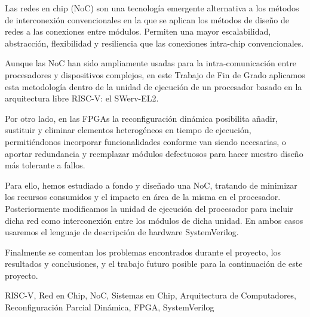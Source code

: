 
Las redes en chip (NoC) son una tecnología emergente alternativa a los métodos de interconexión convencionales en la que se aplican los métodos de diseño de redes a las conexiones entre módulos. Permiten una mayor escalabilidad, abstracción, flexibilidad y resiliencia que las conexiones intra-chip convencionales.

Aunque las NoC han sido ampliamente usadas para la intra-comunicación entre procesadores y dispositivos complejos, en este Trabajo de Fin de Grado aplicamos esta metodología dentro de la unidad de ejecución de un procesador basado en la arquitectura libre RISC-V: el SWerv-EL2.

Por otro lado, en las FPGAs la reconfiguración dinámica posibilita añadir, sustituir y eliminar elementos heterogéneos en tiempo de ejecución, permitiéndonos incorporar funcionalidades conforme van siendo necesarias, o aportar redundancia y reemplazar módulos defectuosos para hacer nuestro diseño más tolerante a fallos.

Para ello, hemos estudiado a fondo y diseñado una NoC, tratando de minimizar los recursos consumidos y el impacto en área de la misma en el procesador. Posteriormente modificamos la unidad de ejecución del procesador para incluir dicha red como interconexión entre los módulos de dicha unidad. En ambos casos usaremos el lenguaje de descripción de hardware SystemVerilog.

Finalmente se comentan los problemas encontrados durante el proyecto, los resultados y conclusiones, y el trabajo futuro posible para la continuación de este proyecto.

\vfill
\begin{keywords}[title=Palabras clave]
\small RISC-V, Red en Chip, NoC, Sistemas en Chip, Arquitectura de Computadores, Reconfiguración Parcial Dinámica, FPGA, SystemVerilog
\end{keywords}